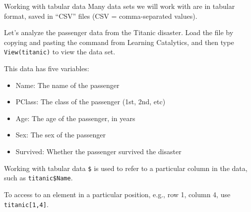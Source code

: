 \documentclass{beamer}\usepackage[]{graphicx}\usepackage[]{color}
\makeatletter
\newcommand{\hlopt}[1]{\textcolor[rgb]{1,0.894,0.769}{#1}}%
\newcommand{\hlstd}[1]{\textcolor[rgb]{1,0.894,0.769}{#1}}%
\newcommand{\hlkwd}[1]{\textcolor[rgb]{1,0.78,0.769}{#1}}%
\newenvironment{kframe}{%
 \def\at@end@of@kframe{}%
 \ifinner\ifhmode%
  \def\at@end@of@kframe{\end{minipage}}%
  \begin{minipage}{\columnwidth}%
 \fi\fi%
 \def\FrameCommand##1{\hskip\@totalleftmargin \hskip-\fboxsep
 \colorbox{shadecolor}{##1}\hskip-\fboxsep
     \hskip-\linewidth \hskip-\@totalleftmargin \hskip\columnwidth}%
 \MakeFramed {\advance\hsize-\width
   \@totalleftmargin\z@ \linewidth\hsize
   \@setminipage}}%
 {\par\unskip\endMakeFramed%
 \at@end@of@kframe}
\newenvironment{knitrout}{}{} %
\makeatother
\begin{document}
\begin{darkframes}
    \begin{frame}[fragile]{Working with tabular data}
      Many data sets we will work with are in tabular format, saved in ``CSV'' files (CSV = comma-separated values).

      \bigskip\pause

      Let's analyze the passenger data from the Titanic disaster. Load the file by copying and pasting the command from Learning Catalytics, and then type \verb|View(titanic)| to view the data set.

      \bigskip\pause

      This data has five variables:
      \begin{itemize}
        \item \alert{Name}: The name of the passenger
        \item \alert{PClass}: The class of the passenger (1st, 2nd, etc)
        \item \alert{Age}: The age of the passenger, in years
        \item \alert{Sex}: The sex of the passenger
        \item \alert{Survived}: Whether the passenger survived the disaster
      \end{itemize}
    \end{frame}



    \begin{frame}[fragile]{Working with tabular data}
      \verb|$| is used to refer to a particular column in the data, such as \verb|titanic$Name|.   \pause

      \bigskip

      To access to an element in a particular position, e.g., row 1, column 4, use \verb|titanic[1,4]|.


    \end{frame}


\end{darkframes}
\end{document}
